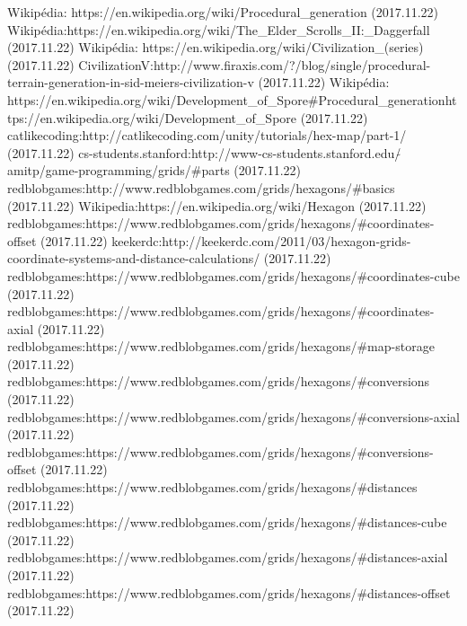 \begin{thebibliography}{x}

 Wikipédia: https://en.wikipedia.org/wiki/Procedural\_generation (2017.11.22)
Wikipédia:\;https://en.wikipedia.org/wiki/The\_Elder\_Scrolls\_II:\_Daggerfall (2017.11.22)
 Wikipédia: https://en.wikipedia.org/wiki/Civilization\_(series) (2017.11.22)
Civilization\;V:\;http://www.firaxis.com/?/blog/single/procedural-terrain-generation-in-sid-meiers-civilization-v (2017.11.22)
 Wikipédia: https://en.wikipedia.org/wiki/Development\_of\_Spore\#Procedural\_generationhttps://en.wikipedia.org/wiki/Development\_of\_Spore (2017.11.22)
 catlikecoding:\;http://catlikecoding.com/unity/tutorials/hex-map/part-1/ (2017.11.22)
 cs-students.stanford:\;http://www-cs-students.stanford.edu/$\tilde{}$amitp/game-programming/grids/\#parts (2017.11.22)
 redblobgames:\;http://www.redblobgames.com/grids/hexagons/\#basics (2017.11.22)
 Wikipedia:\;https://en.wikipedia.org/wiki/Hexagon (2017.11.22)
 redblobgames:\;https://www.redblobgames.com/grids/hexagons/\#coordinates-offset (2017.11.22)
 keekerdc:\;http://keekerdc.com/2011/03/hexagon-grids-coordinate-systems-and-distance-calculations/ (2017.11.22)
 redblobgames:\;https://www.redblobgames.com/grids/hexagons/\#coordinates-cube (2017.11.22)
 redblobgames:\;https://www.redblobgames.com/grids/hexagons/\#coordinates-axial (2017.11.22)
 redblobgames:\;https://www.redblobgames.com/grids/hexagons/\#map-storage (2017.11.22)
 redblobgames:\;https://www.redblobgames.com/grids/hexagons/\#conversions (2017.11.22)
 redblobgames:\;https://www.redblobgames.com/grids/hexagons/\#conversions-axial (2017.11.22)
 redblobgames:\;https://www.redblobgames.com/grids/hexagons/\#conversions-offset (2017.11.22)
 redblobgames:\;https://www.redblobgames.com/grids/hexagons/\#distances (2017.11.22)
 redblobgames:\;https://www.redblobgames.com/grids/hexagons/\#distances-cube (2017.11.22)
 redblobgames:\;https://www.redblobgames.com/grids/hexagons/\#distances-axial (2017.11.22)
 redblobgames:\;https://www.redblobgames.com/grids/hexagons/\#distances-offset (2017.11.22)


\end{thebibliography}
